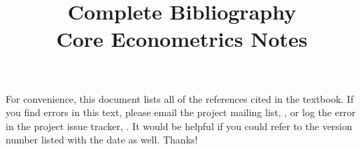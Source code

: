 \documentclass[nohyper]{external/tufte-handout}
\title[Complete bibliography]%
{Complete Bibliography \\
  Core Econometrics Notes}
\begin{document}
\maketitle

For convenience, this document lists all of the references cited in
the textbook.  If you find errors in this text, please email the
project mailing list, \maillist, or log the error in the project issue
tracker, \bugtrack.  It would be helpful if you could refer to the
version number listed with the date as well.  Thanks!

\nocite{*}


\end{document}
